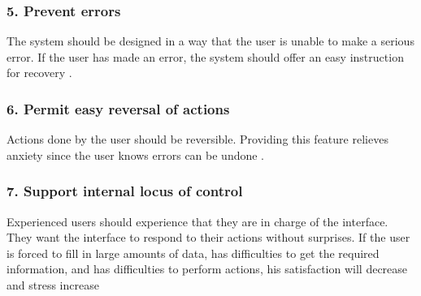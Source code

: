 \subsubsection{5. Prevent errors}
The system should be designed in a way that the user is unable to make a serious error. If the user has made an error, the system should offer an easy instruction for recovery \cite{schneiderman}.

\subsubsection{6. Permit easy reversal of actions}
Actions done by the user should be reversible. Providing this feature relieves anxiety since the user knows errors can be undone \cite{schneiderman}.

\subsubsection{7. Support internal locus of control}
Experienced users should experience that they are in charge of the interface. They want the interface to respond to their actions without surprises. If the user is forced to fill in large amounts of data, has difficulties to get the required information, and has difficulties to perform actions, his satisfaction will decrease and stress increase \cite{schneiderman}
\newpage